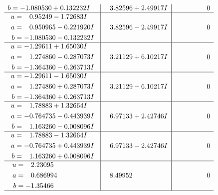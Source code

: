 \documentclass[1p]{elsarticle_modified}
\theoremstyle{definition}
\begin{document}
$$\begin{array}{c|c|c}
\begin{aligned}
b &= -1.080530 + 0.132232 I\end{aligned}
 & \phantom{-}3.82596 + 2.49917 I & \phantom{-0.000000 } 0 \\ \hline\begin{aligned}
u &= \phantom{-}0.95249 - 1.72683 I \\
a &= \phantom{-}0.950965 - 0.221920 I \\
b &= -1.080530 - 0.132232 I\end{aligned}
 & \phantom{-}3.82596 - 2.49917 I & \phantom{-0.000000 } 0 \\ \hline\begin{aligned}
u &= -1.29611 + 1.65030 I \\
a &= \phantom{-}1.274860 - 0.287073 I \\
b &= -1.364360 - 0.263713 I\end{aligned}
 & \phantom{-}3.21129 + 6.10217 I & \phantom{-0.000000 } 0 \\ \hline\begin{aligned}
u &= -1.29611 - 1.65030 I \\
a &= \phantom{-}1.274860 + 0.287073 I \\
b &= -1.364360 + 0.263713 I\end{aligned}
 & \phantom{-}3.21129 - 6.10217 I & \phantom{-0.000000 } 0 \\ \hline\begin{aligned}
u &= \phantom{-}1.78883 + 1.32664 I \\
a &= -0.764735 - 0.443939 I \\
b &= \phantom{-}1.163260 - 0.008096 I\end{aligned}
 & \phantom{-}6.97133 + 2.42746 I & \phantom{-0.000000 } 0 \\ \hline\begin{aligned}
u &= \phantom{-}1.78883 - 1.32664 I \\
a &= -0.764735 + 0.443939 I \\
b &= \phantom{-}1.163260 + 0.008096 I\end{aligned}
 & \phantom{-}6.97133 - 2.42746 I & \phantom{-0.000000 } 0 \\ \hline\begin{aligned}
u &= \phantom{-}2.23095\phantom{ +0.000000I} \\
a &= \phantom{-}0.686994\phantom{ +0.000000I} \\
b &= -1.35466\phantom{ +0.000000I}\end{aligned}
 & \phantom{-}8.49952\phantom{ +0.000000I} & \phantom{-0.000000 } 0\\
 \hline 
 \end{array}$$\newpage\newpage\renewcommand{\arraystretch}{1}
\end{document}
